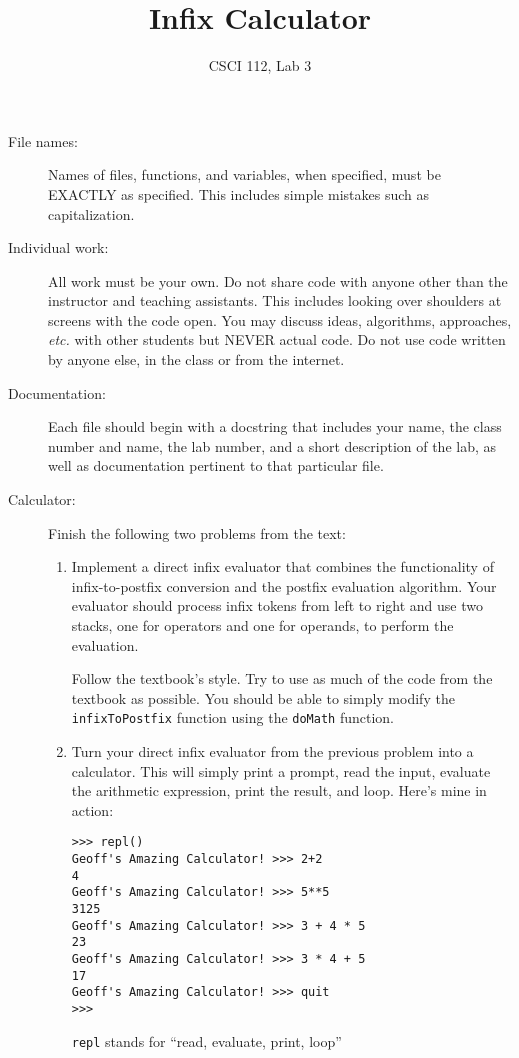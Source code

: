 \documentclass{article}
\title{Infix Calculator}
\author{CSCI 112, Lab 3}
\date{}
\begin{document}
\sloppy

\maketitle

\begin{description} 
\item[File names:]  Names of files, functions, and variables, 
when specified,
must be EXACTLY as specified.  This includes simple mistakes such
as capitalization.

\item[Individual work:]  All work must be your own.  Do not share
code with anyone other than the instructor and teaching assistants.
This includes looking over shoulders at screens with the code open.
You may discuss ideas, algorithms, approaches, {\em etc.} with
other students but NEVER actual code.  Do not use code
written by anyone else, in the class or from the internet.

\item[Documentation:] Each file should begin with a docstring
that includes your name, the class number and name, the lab
number, and  
a short description of the lab, as well as documentation pertinent
to that particular file.

\item[Calculator:] Finish the following two problems from the text:
\begin{enumerate}
\item
Implement a direct infix evaluator that combines the functionality of infix-to-postfix conversion and the postfix evaluation algorithm. Your evaluator should process infix tokens from left to right and use two stacks, one for operators and one for operands, to perform the evaluation.

Follow the textbook's style.  Try to use as much of the code from the textbook
as possible.  You should be able to simply modify the \lstinline{infixToPostfix}
function using the \lstinline{doMath} function.
\item
Turn your direct infix evaluator from the previous problem into a calculator.
This will simply print a prompt, read the input, evaluate the arithmetic 
expression, print the result, and loop.  Here's mine in action:
\begin{Verbatim}[frame=single]
>>> repl()
Geoff's Amazing Calculator! >>> 2+2
4
Geoff's Amazing Calculator! >>> 5**5
3125
Geoff's Amazing Calculator! >>> 3 + 4 * 5
23
Geoff's Amazing Calculator! >>> 3 * 4 + 5
17
Geoff's Amazing Calculator! >>> quit
>>> 
\end{Verbatim}
{\tt repl} stands for ``read, evaluate, print, loop''


\end{enumerate}
\end{description}
\end{document}
